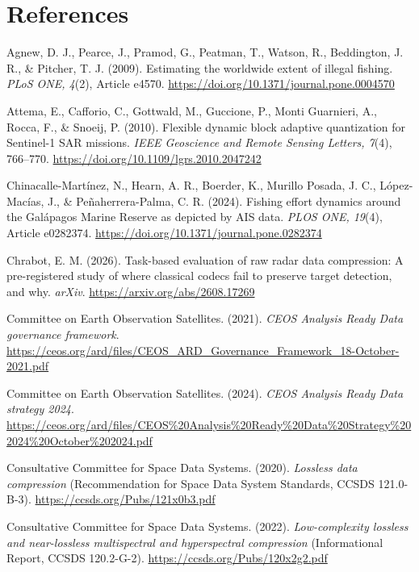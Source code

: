 \documentclass[11pt]{article}
\newcommand{\refentry}[1]{\par\noindent\hangindent=0.4in\hangafter=1 #1\par\medskip}
\begin{document}
\section*{References}

\refentry{Agnew, D. J., Pearce, J., Pramod, G., Peatman, T., Watson, R., Beddington, J. R., \& Pitcher, T. J. (2009). Estimating the worldwide extent of illegal fishing. \textit{PLoS ONE, 4}(2), Article e4570. \url{https://doi.org/10.1371/journal.pone.0004570}}

\refentry{Attema, E., Cafforio, C., Gottwald, M., Guccione, P., Monti Guarnieri, A., Rocca, F., \& Snoeij, P. (2010). Flexible dynamic block adaptive quantization for Sentinel-1 SAR missions. \textit{IEEE Geoscience and Remote Sensing Letters, 7}(4), 766--770. \url{https://doi.org/10.1109/lgrs.2010.2047242}}

\refentry{Chinacalle-Mart\'inez, N., Hearn, A. R., Boerder, K., Murillo Posada, J. C., L\'opez-Mac\'ias, J., \& Pe\~naherrera-Palma, C. R. (2024). Fishing effort dynamics around the Gal\'apagos Marine Reserve as depicted by AIS data. \textit{PLOS ONE, 19}(4), Article e0282374. \url{https://doi.org/10.1371/journal.pone.0282374}}

\refentry{Chrabot, E. M. (2026). Task-based evaluation of raw radar data compression: A pre-registered study of where classical codecs fail to preserve target detection, and why. \textit{arXiv}. \url{https://arxiv.org/abs/2608.17269}}

\refentry{Committee on Earth Observation Satellites. (2021). \textit{CEOS Analysis Ready Data governance framework}. \url{https://ceos.org/ard/files/CEOS_ARD_Governance_Framework_18-October-2021.pdf}}

\refentry{Committee on Earth Observation Satellites. (2024). \textit{CEOS Analysis Ready Data strategy 2024}. \url{https://ceos.org/ard/files/CEOS\%20Analysis\%20Ready\%20Data\%20Strategy\%202024\%20October\%202024.pdf}}

\refentry{Consultative Committee for Space Data Systems. (2020). \textit{Lossless data compression} (Recommendation for Space Data System Standards, CCSDS 121.0-B-3). \url{https://ccsds.org/Pubs/121x0b3.pdf}}

\refentry{Consultative Committee for Space Data Systems. (2022). \textit{Low-complexity lossless and near-lossless multispectral and hyperspectral compression} (Informational Report, CCSDS 120.2-G-2). \url{https://ccsds.org/Pubs/120x2g2.pdf}}
\end{document}
